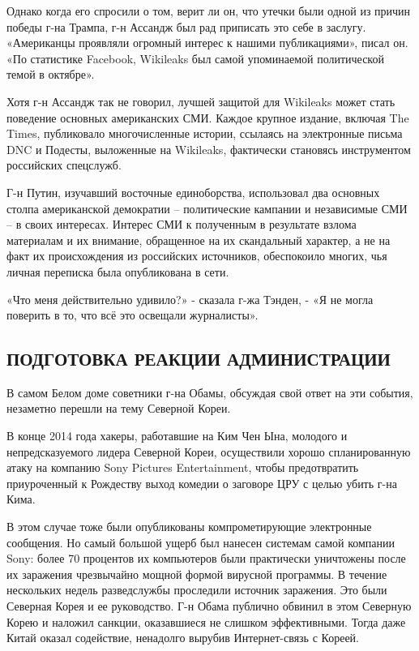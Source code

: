 Однако когда его спросили о том, верит ли он, что утечки были одной из
причин победы г-на Трампа, г-н Ассандж был рад приписать это себе в
заслугу. «Американцы проявляли огромный интерес к нашими публикациями»,
писал он. «По статистике Facebook, Wikileaks был самой упоминаемой
политической темой в октябре».

Хотя г-н Ассандж так не говорил, лучшей защитой для Wikileaks может
стать поведение основных американских СМИ. Каждое крупное издание,
включая The Times, публиковало многочисленные истории, ссылаясь на
электронные письма DNC и Подесты, выложенные на Wikileaks, фактически
становясь инструментом российских спецслужб.

Г-н Путин, изучавший восточные единоборства, использовал два основных
столпа американской демократии -- политические кампании и независимые
СМИ -- в своих интересах. Интерес СМИ к полученным в результате взлома
материалам и их внимание, обращенное на их скандальный характер, а не на
факт их происхождения из российских источников, обеспокоило многих, чья
личная переписка была опубликована в сети.

«Что меня действительно удивило?» - сказала г-жа Тэнден, - «Я не могла
поверить в то, что всё это освещали журналисты».

\hypertarget{ux43fux43eux434ux433ux43eux442ux43eux432ux43aux430-ux440ux435ux430ux43aux446ux438ux438-ux430ux434ux43cux438ux43dux438ux441ux442ux440ux430ux446ux438ux438}{%
\subsection{\texorpdfstring{\textbf{ПОДГОТОВКА РЕАКЦИИ
АДМИНИСТРАЦИИ}}{ПОДГОТОВКА РЕАКЦИИ АДМИНИСТРАЦИИ}}\label{ux43fux43eux434ux433ux43eux442ux43eux432ux43aux430-ux440ux435ux430ux43aux446ux438ux438-ux430ux434ux43cux438ux43dux438ux441ux442ux440ux430ux446ux438ux438}}

В самом Белом доме советники г-на Обамы, обсуждая свой ответ на эти
события, незаметно перешли на тему Северной Кореи.

В конце 2014 года хакеры, работавшие на Ким Чен Ына, молодого и
непредсказуемого лидера Северной Кореи, осуществили хорошо
спланированную атаку на компанию Sony Pictures Entertainment, чтобы
предотвратить приуроченный к Рождеству выход комедии о заговоре ЦРУ с
целью убить г-на Кима.

В этом случае тоже были опубликованы компрометирующие электронные
сообщения. Но самый большой ущерб был нанесен системам самой компании
Sony: более 70 процентов их компьютеров были практически уничтожены
после их заражения чрезвычайно мощной формой вирусной программы. В
течение нескольких недель разведслужбы проследили источник заражения.
Это были Северная Корея и ее руководство. Г-н Обама публично обвинил в
этом Северную Корею и наложил санкции, оказавшиеся не слишком
эффективными. Тогда даже Китай оказал содействие, ненадолго вырубив
Интернет-связь с Кореей.

